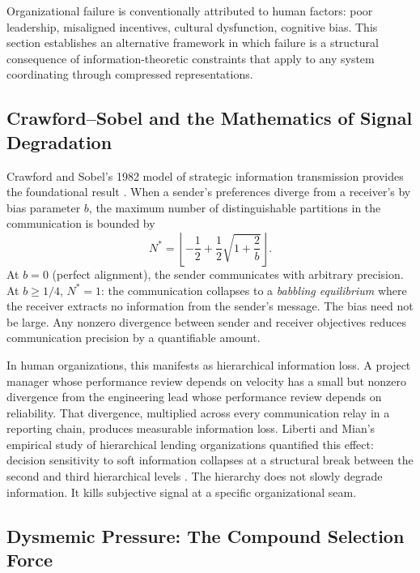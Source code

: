 \documentclass[11pt,a4paper]{article}
\begin{document}
Organizational failure is conventionally attributed to human factors: poor leadership, misaligned incentives, cultural dysfunction, cognitive bias. This section establishes an alternative framework in which failure is a structural consequence of information-theoretic constraints that apply to any system coordinating through compressed representations.

\subsection{Crawford--Sobel and the Mathematics of Signal Degradation}

Crawford and Sobel's 1982 model of strategic information transmission provides the foundational result \citep{crawford1982}. When a sender's preferences diverge from a receiver's by bias parameter $b$, the maximum number of distinguishable partitions in the communication is bounded by
\begin{equation}
\label{eq:cs}
N^* = \left\lfloor -\frac{1}{2} + \frac{1}{2}\sqrt{1 + \frac{2}{b}} \right\rfloor.
\end{equation}
At $b = 0$ (perfect alignment), the sender communicates with arbitrary precision. At $b \geq 1/4$, $N^* = 1$: the communication collapses to a \emph{babbling equilibrium} where the receiver extracts no information from the sender's message. The bias need not be large. Any nonzero divergence between sender and receiver objectives reduces communication precision by a quantifiable amount.

In human organizations, this manifests as hierarchical information loss. A project manager whose performance review depends on velocity has a small but nonzero divergence from the engineering lead whose performance review depends on reliability. That divergence, multiplied across every communication relay in a reporting chain, produces measurable information loss. Liberti and Mian's empirical study of hierarchical lending organizations quantified this effect: decision sensitivity to soft information collapses at a structural break between the second and third hierarchical levels \citep{liberti2009}. The hierarchy does not slowly degrade information. It kills subjective signal at a specific organizational seam.

\subsection{Dysmemic Pressure: The Compound Selection Force}
\end{document}
